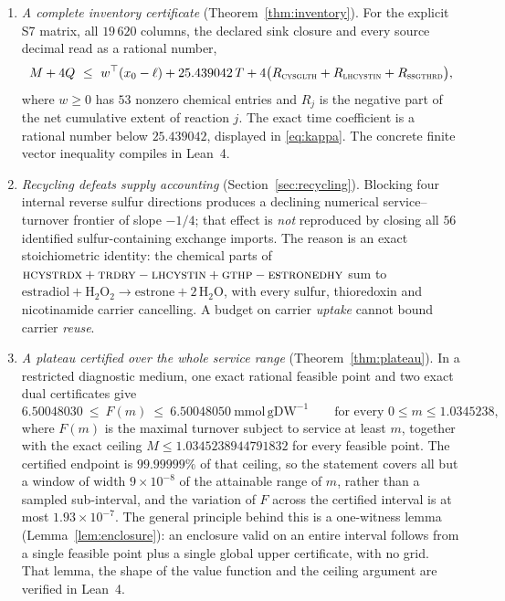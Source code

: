 \documentclass[11pt,a4paper]{article}
\theoremstyle{plain}
\theoremstyle{definition}
\theoremstyle{remark}
\newcommand{\mmolg}{\mathrm{mmol}\,\mathrm{gDW}^{-1}}
\newcommand{\rx}[1]{\textnormal{\textsc{#1}}}
\begin{document}
\begin{enumerate}[label=(\roman*)]
\item \emph{A complete inventory certificate} (Theorem~\ref{thm:inventory}).
For the explicit S7 matrix, all $19\,620$ columns, the declared sink closure
and every source decimal read as a rational number,
\[
M+4Q\ \le\ w^{\top}(x_0-\ell)+25.439042\,T
+4\bigl(R_{\rx{cysglth}}+R_{\rx{lhcystin}}+R_{\rx{ssgthrd}}\bigr),
\]
where $w\ge0$ has $53$ nonzero chemical entries and $R_j$ is the negative part
of the net cumulative extent of reaction $j$. The exact time coefficient is a
rational number below $25.439042$, displayed in \eqref{eq:kappa}. The concrete
finite vector inequality compiles in Lean~4.

\item \emph{Recycling defeats supply accounting}
(Section~\ref{sec:recycling}). Blocking four internal reverse sulfur directions
produces a declining numerical service--turnover frontier of slope $-1/4$; that
effect is \emph{not} reproduced by closing all $56$ identified sulfur-containing
exchange imports. The reason is an exact stoichiometric identity: the chemical
parts of $\rx{hcystrdx}+\rx{trdry}-\rx{lhcystin}+\rx{gthp}-\rx{estronedhy}$
sum to $\text{estradiol}+\mathrm H_2\mathrm O_2\to\text{estrone}+
2\,\mathrm H_2\mathrm O$, with every sulfur, thioredoxin and nicotinamide
carrier cancelling. A budget on carrier \emph{uptake} cannot bound carrier
\emph{reuse}.

\item \emph{A plateau certified over the whole service range}
(Theorem~\ref{thm:plateau}). In a restricted diagnostic medium, one exact
rational feasible point and two exact dual certificates give
\[
6.50048030\ \le\ F(m)\ \le\ 6.50048050\ \mmolg
\qquad\text{for every }0\le m\le 1.0345238 ,
\]
where $F(m)$ is the maximal turnover subject to service at least $m$, together
with the exact ceiling $M\le 1.0345238944791832$ for every feasible point. The
certified endpoint is $99.99999\%$ of that ceiling, so the statement covers all
but a window of width $9\times10^{-8}$ of the attainable range of $m$, rather
than a sampled sub-interval, and the variation of $F$ across the certified
interval is at most $1.93\times10^{-7}$. The general principle
behind this is a one-witness lemma (Lemma~\ref{lem:enclosure}): an enclosure
valid on an entire interval follows from a single feasible point plus a single
global upper certificate, with no grid. That lemma, the shape of the value
function and the ceiling argument are verified in Lean~4.


\end{enumerate}
\end{document}
